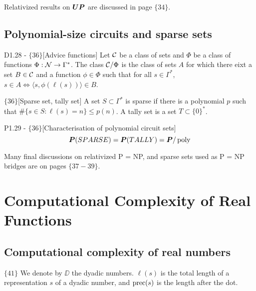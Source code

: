 \documentclass{article}
\begin{document}
Relativized results on $\boldsymbol{UP}$ are discussed in page $\{34\}$.

\subsection{Polynomial-size circuits and sparse sets}

\begin{flexidefinition}{D1.28 - $\{36\}$}[Advice functions]
    Let $\mathcal{C}$ be a class of sets and $\Phi$ be a class of functions $\Phi : \mathcal{N} \to \Gamma^\ast$. The class $\mathcal{C} / \Phi$ is the class of sets $A$ for which there eixt a set $B \in \mathcal{C}$ and a function $\phi \in \Phi$ such that for all $s \in \Gamma^\ast$, $s \in A \iff \langle s, \phi(\ell(s)) \rangle \in B$. 
\end{flexidefinition}

\begin{definition}{$\{36\}$}[Sparse set, tally set]
    A set $S \subset \Gamma^\ast$ is sparse if there is a polynomial $p$ such that $\# \{s \in S : \ell(s) = n\} \leq p(n)$. A tally set is a set $T \subset \{0\}^\ast$.  
\end{definition}

\begin{flexidefinition}{P1.29 - $\{36\}$}[Characterisation of polynomial circuit sets]
    \begin{equation}
        \boldsymbol{P}(SPARSE) = \boldsymbol{P}(TALLY) = \boldsymbol{P}/\operatorname{poly}
    \end{equation}
\end{flexidefinition}

Many final discussions on relativized P = NP, and sparse sets used as P = NP bridges are on pages $\{37-39\}$.

\section{Computational Complexity of Real Functions}

\subsection{Computational complexity of real numbers}

$\{41\}$ We denote by $\DD$ the dyadic numbers. $\ell(s)$ is the total length of a representation $s$ of a dyadic number, and $\operatorname{prec} (s)$ is the length after the dot.
\end{document}
